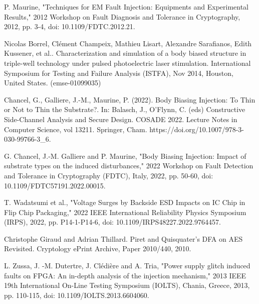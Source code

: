\begin{thebibliography}{1}
P. Maurine, "Techniques for EM Fault Injection: Equipments and Experimental Results," 2012 Workshop on Fault Diagnosis and Tolerance in Cryptography, 2012, pp. 3-4, doi: 10.1109/FDTC.2012.21.

Nicolas Borrel, Clément Champeix, Mathieu Lisart, Alexandre Sarafianos, Edith Kussener, et al.. Characterization and simulation of a body biased structure in triple-well technology under pulsed photoelectric laser stimulation. International Symposium for Testing and Failure Analysis (ISTFA), Nov 2014, Houston, United States. (emse-01099035)

Chancel, G., Galliere, J.-M., Maurine, P. (2022). Body Biasing Injection: To Thin or Not to Thin the Substrate?. In: Balasch, J., O’Flynn, C. (eds) Constructive Side-Channel Analysis and Secure Design. COSADE 2022. Lecture Notes in Computer Science, vol 13211. Springer, Cham. https://doi.org/10.1007/978-3-030-99766-3\_6.

G. Chancel, J.-M. Galliere and P. Maurine, "Body Biasing Injection: Impact of substrate types on the induced disturbances," 2022 Workshop on Fault Detection and Tolerance in Cryptography (FDTC), Italy, 2022, pp. 50-60, doi: 10.1109/FDTC57191.2022.00015.

T. Wadatsumi et al., "Voltage Surges by Backside ESD Impacts on IC Chip in Flip Chip Packaging," 2022 IEEE International Reliability Physics Symposium (IRPS), 2022, pp. P14-1-P14-6, doi: 10.1109/IRPS48227.2022.9764457.

Christophe Giraud and Adrian Thillard. Piret and Quisquater's DFA on AES Revisited. Cryptology ePrint Archive, Paper 2010/440, 2010.

L. Zussa, J. -M. Dutertre, J. Clédière and A. Tria, "Power supply glitch induced faults on FPGA: An in-depth analysis of the injection mechanism," 2013 IEEE 19th International On-Line Testing Symposium (IOLTS), Chania, Greece, 2013, pp. 110-115, doi: 10.1109/IOLTS.2013.6604060.

\end{thebibliography}

